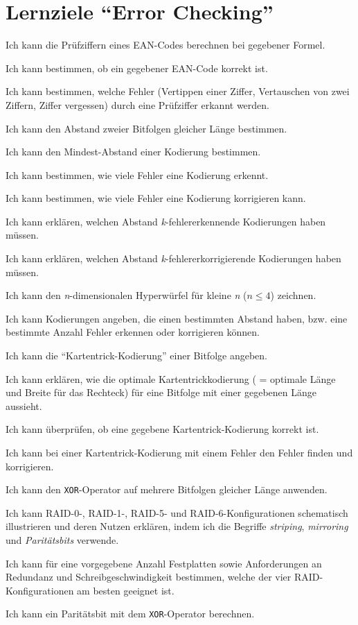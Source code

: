 \chapter{Lernziele \enquote{Error Checking}}
\begin{todolist}
\item Ich kann die Prüfziffern eines EAN-Codes berechnen bei gegebener Formel.
\item Ich kann bestimmen, ob ein gegebener EAN-Code korrekt ist.
\item Ich kann bestimmen, welche Fehler (Vertippen einer Ziffer, Vertauschen von zwei Ziffern, Ziffer vergessen) durch eine Prüfziffer erkannt werden.
\item Ich kann den Abstand zweier Bitfolgen gleicher Länge bestimmen.
\item Ich kann den Mindest-Abstand einer Kodierung bestimmen.
\item Ich kann bestimmen, wie viele Fehler eine Kodierung erkennt.
\item Ich kann bestimmen, wie viele Fehler eine Kodierung korrigieren kann.
\item Ich kann erklären, welchen Abstand \textit{k}-fehlererkennende Kodierungen haben müssen.
\item Ich kann erklären, welchen Abstand \textit{k}-fehlererkorrigierende Kodierungen haben müssen.
\item Ich kann den \textit{n}-dimensionalen Hyperwürfel für kleine \textit{n} ($n\leq 4$) zeichnen.
\item Ich kann Kodierungen angeben, die einen bestimmten Abstand haben, bzw. eine bestimmte Anzahl Fehler erkennen oder korrigieren können.
\item Ich kann die ``Kartentrick-Kodierung'' einer Bitfolge angeben.
\item Ich kann erklären, wie die optimale Kartentrickkodierung ( = optimale Länge und Breite für das Rechteck) für eine Bitfolge mit einer gegebenen Länge aussieht.
\item Ich kann überprüfen, ob eine gegebene Kartentrick-Kodierung korrekt ist.
\item Ich kann bei einer Kartentrick-Kodierung mit einem Fehler den Fehler finden und korrigieren.
\item Ich kann den \texttt{XOR}-Operator auf mehrere Bitfolgen gleicher Länge anwenden.
\item Ich kann RAID-0-, RAID-1-, RAID-5- und RAID-6-Konfigurationen schematisch illustrieren und deren Nutzen erklären, indem ich die Begriffe \textit{striping}, \textit{mirroring} und \textit{Paritätsbits} verwende.
\item Ich kann für eine vorgegebene Anzahl Festplatten sowie Anforderungen an Redundanz und Schreibgeschwindigkeit bestimmen, welche der vier RAID-Konfigurationen am besten geeignet ist.
\item Ich kann ein Paritätsbit mit dem \texttt{XOR}-Operator berechnen.
\end{todolist}
